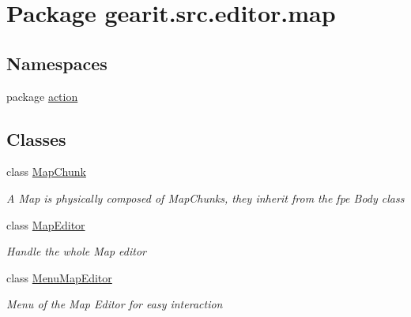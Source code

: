 \hypertarget{namespacegearit_1_1src_1_1editor_1_1map}{\section{Package gearit.\+src.\+editor.\+map}
\label{namespacegearit_1_1src_1_1editor_1_1map}
}
\subsection*{Namespaces}
\begin{DoxyCompactItemize}
\item 
package \hyperlink{namespacegearit_1_1src_1_1editor_1_1map_1_1action}{action}
\end{DoxyCompactItemize}
\subsection*{Classes}
\begin{DoxyCompactItemize}
\item 
class \hyperlink{classgearit_1_1src_1_1editor_1_1map_1_1_map_chunk}{Map\+Chunk}
\begin{DoxyCompactList}\small\item\em A Map is physically composed of Map\+Chunks, they inherit from the fpe Body class \end{DoxyCompactList}\item 
class \hyperlink{classgearit_1_1src_1_1editor_1_1map_1_1_map_editor}{Map\+Editor}
\begin{DoxyCompactList}\small\item\em Handle the whole Map editor \end{DoxyCompactList}\item 
class \hyperlink{classgearit_1_1src_1_1editor_1_1map_1_1_menu_map_editor}{Menu\+Map\+Editor}
\begin{DoxyCompactList}\small\item\em Menu of the Map Editor for easy interaction \end{DoxyCompactList}\end{DoxyCompactItemize}
